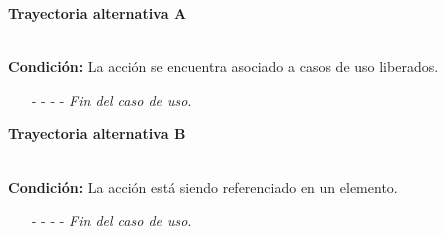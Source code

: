 \hypertarget{CU11-1-3:TAA}{\textbf{Trayectoria alternativa A}}\\
\noindent \textbf{Condición:} La acción se encuentra asociado a casos de uso liberados.
\begin{enumerate}
	\UCpaso[\UCsist] Oculta el botón \eliminar de la acción que esta asociado a casos de uso liberados.
	\item[- -] - - {\em {Fin del caso de uso}}.
\end{enumerate}
\hypertarget{CU11-1-3:TAB}{\textbf{Trayectoria alternativa B}}\\
\noindent \textbf{Condición:} La acción está siendo referenciado en un elemento.
\begin{enumerate}
	\UCpaso[\UCsist] Muestra la pantalla  o  con el mensaje .
	\item[- -] - - {\em {Fin del caso de uso}}.%
\end{enumerate}
	

